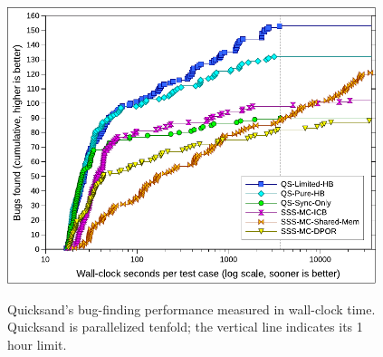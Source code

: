 \begin{figure}[h]
	\begin{center}
        \includegraphics[width=0.96\textwidth]{../proposal/dowefindbugsfaster-wallclock-v2.pdf} \\
	\end{center}
	\caption[Quicksand's bug-finding performance measured in wall-clock time.]
		{Quicksand's bug-finding performance measured in wall-clock time.
		Quicksand is parallelized tenfold; the vertical line indicates its 1 hour limit.}
        \label{fig:dowefindbugsfaster-wall}
\end{figure}


